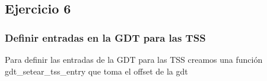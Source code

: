 \subsection{Ejercicio 6}

\subsubsection{Definir entradas en la GDT para las TSS}

Para definir las entradas de la GDT para las TSS creamos una función gdt_setear_tss_entry que toma el offset de la gdt 
